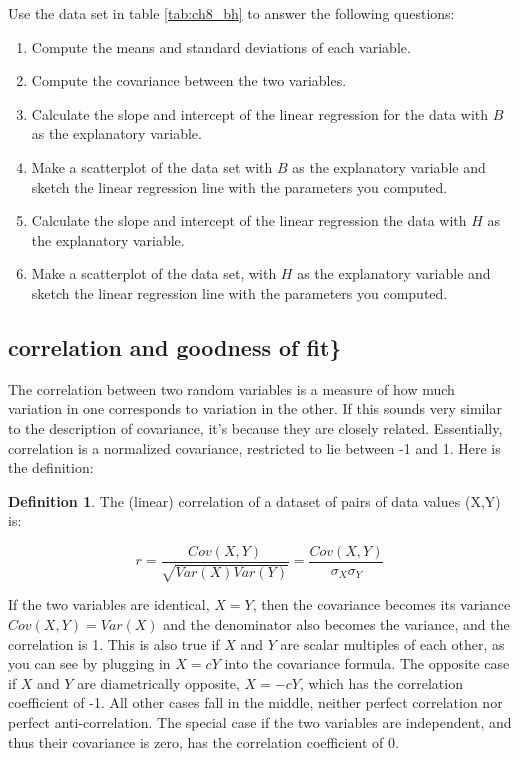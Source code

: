 \documentclass[
]{book}
\theoremstyle{definition}
\newtheorem{definition}{Definition}[chapter]
\theoremstyle{definition}
\theoremstyle{definition}
\theoremstyle{remark}
\begin{document}
\label{tab:ch8_bh}

Use the data set in table \ref{tab:ch8_bh} to answer the following questions:

\begin{enumerate}
\def\labelenumi{\arabic{enumi}.}
\item
  Compute the means and standard deviations of each variable.
\item
  Compute the covariance between the two variables.
\item
  Calculate the slope and intercept of the linear regression for the data with \(B\) as the explanatory variable.
\item
  Make a scatterplot of the data set with \(B\) as the explanatory variable and sketch the linear regression line with the parameters you computed.
\item
  Calculate the slope and intercept of the linear regression the data with \(H\) as the explanatory variable.
\item
  Make a scatterplot of the data set, with \(H\) as the explanatory variable and sketch the linear regression line with the parameters you computed.
\end{enumerate}

\hypertarget{correlation-and-goodness-of-fit}{%
\subsection{correlation and goodness of fit\}}\label{correlation-and-goodness-of-fit}}

The correlation between two random variables is a measure of how much variation in one corresponds to variation in the other. If this sounds very similar to the description of covariance, it's because they are closely related. Essentially, correlation is a normalized covariance, restricted to lie between -1 and 1. Here is the definition:

\begin{definition}
\protect\hypertarget{def:def-corr}{}{\label{def:def-corr} }The  (linear) correlation of a dataset of pairs of data values (X,Y) is:
\end{definition}
\[ r = \frac{Cov(X,Y)}{\sqrt{{Var(X)}{Var(Y)}}} =  \frac{Cov(X,Y)}{\sigma_X \sigma_Y}
\]

If the two variables are identical, \(X=Y\), then the covariance becomes its variance \(Cov(X,Y) = Var(X)\) and the denominator also becomes the variance, and the correlation is 1. This is also true if \(X\) and \(Y\) are scalar multiples of each other, as you can see by plugging in \(X= cY\) into the covariance formula. The opposite case if \(X\) and \(Y\) are diametrically opposite, \(X = -cY\), which has the correlation coefficient of -1. All other cases fall in the middle, neither perfect correlation nor perfect anti-correlation. The special case if the two variables are independent, and thus their covariance is zero, has the correlation coefficient of 0.
\end{document}
